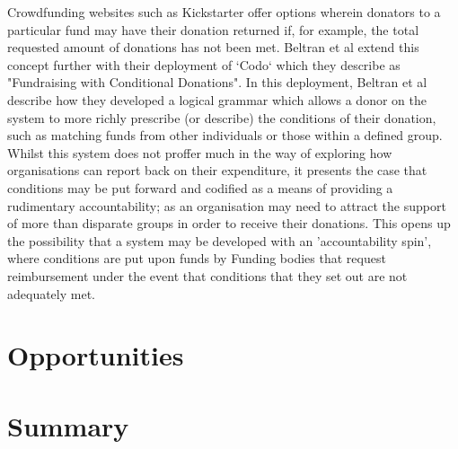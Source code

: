 Crowdfunding websites such as Kickstarter offer options wherein donators to a particular fund may have their donation returned if, for example, the total requested amount of donations has not been met. Beltran et al extend this concept further with their deployment of `Codo` which they describe as "Fundraising with Conditional Donations". In this deployment, Beltran et al describe how they developed a logical grammar which allows a donor on the system to more richly prescribe (or describe) the conditions of their donation, such as matching funds from other individuals or those within a defined group. Whilst this system does not proffer much in the way of exploring how organisations can report back on their expenditure, it presents the case that conditions may be put forward and codified as a means of providing a rudimentary accountability; as an organisation may need to attract the support of more than disparate groups in order to receive their donations. This opens up the possibility that a system may be developed with an 'accountability spin', where conditions are put upon funds by Funding bodies that request reimbursement under the event that conditions that they set out are not adequately met.




\section{Opportunities}

\section{Summary}
\label{sec:related:conclusion}
